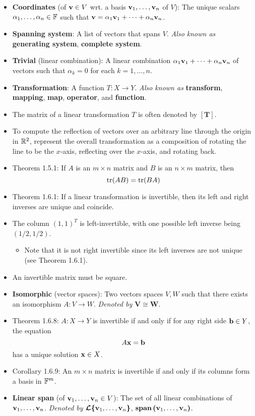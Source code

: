 \documentclass[../../notes.tex]{subfiles}
\begin{document}
\begin{itemize}
    \item {}\textbf{Coordinates} (of $\mathbf{v}\in V$ wrt. a basis $\mathbf{v}_1,\dots,\mathbf{v}_n$ of $V$): The unique scalars $\alpha_1,\dots,\alpha_n\in\mathbb{F}$ such that $\mathbf{v}=\alpha_1\mathbf{v}_1+\cdots+\alpha_n\mathbf{v}_n$.
    \item \textbf{Spanning system}: A list of vectors that spans $V$. \emph{Also known as} \textbf{generating system}, \textbf{complete system}.
    \item \textbf{Trivial} (linear combination): A linear combination $\alpha_1\mathbf{v}_1+\cdots+\alpha_n\mathbf{v}_n$ of vectors such that $\alpha_k=0$ for each $k=1,\dots,n$.
    \item \textbf{Transformation}: A function $T:X\to Y$. \emph{Also known as} \textbf{transform}, \textbf{mapping}, \textbf{map}, \textbf{operator}, and \textbf{function}.
    \item The matrix of a linear transformation $T$ is often denoted by $\bm{[T]}$.
    \item To compute the reflection of vectors over an arbitrary line through the origin in $\mathbb{R}^2$, represent the overall transformation as a composition of rotating the line to be the $x$-axis, reflecting over the $x$-axis, and rotating back.
    \item Theorem 1.5.1: If $A$ is an $m\times n$ matrix and $B$ is an $n\times m$ matrix, then
    \begin{equation*}
        \trace(AB) = \trace(BA)
    \end{equation*}
    \item Theorem 1.6.1: If a linear transformation is invertible, then its left and right inverses are unique and coincide.
    \item The column $(1,1)^T$ is left-invertible, with one possible left inverse being $(1/2,1/2)$.
    \begin{itemize}
        \item Note that it is not right invertible since its left inverses are not unique (see Theorem 1.6.1).
    \end{itemize}
    \item An invertible matrix must be square.
    \item \textbf{Isomorphic} (vector spaces): Two vectors spaces $V,W$ such that there exists an isomorphism $A:V\to W$. \emph{Denoted by} $\bm{V\cong W}$.
    \item Theorem 1.6.8: $A:X\to Y$ is invertible if and only if for any right side $\mathbf{b}\in Y$, the equation
    \begin{equation*}
        A\mathbf{x} = \mathbf{b}
    \end{equation*}
    has a unique solution $\mathbf{x}\in X$.
    \item Corollary 1.6.9: An $m\times n$ matrix is invertible if and only if its columns form a basis in $\mathbb{F}^m$.
    \item \textbf{Linear span} (of $\mathbf{v}_1,\dots,\mathbf{v}_n\in V$): The set of all linear combinations of $\mathbf{v}_1,\dots,\mathbf{v}_n$. \emph{Denoted by} $\bm{\mathcal{L}\{}\mathbf{v}_1,\dots,\mathbf{v}_n\bm{\}}$, $\textbf{span}\,\bm{(}\mathbf{v}_1,\dots,\mathbf{v}_n\bm{)}$.
\end{itemize}
\end{document}
